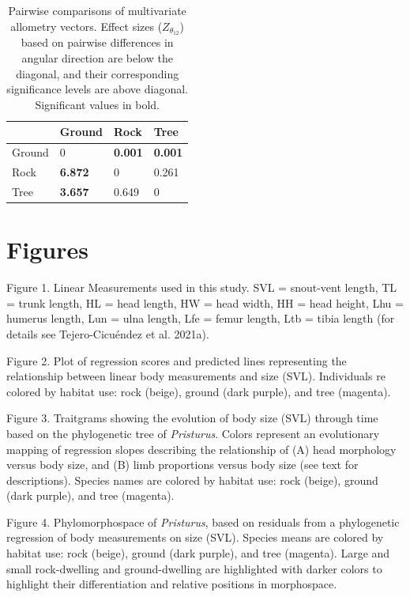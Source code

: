 \documentclass[
]{article}
\begin{document}
\begin{table}[H]

\caption{\label{tab:unnamed-chunk-2}Pairwise comparisons of multivariate allometry vectors. Effect sizes ($Z_{\theta_{12}}$) based on pairwise differences in angular direction are below the diagonal, and their corresponding significance levels are above diagonal. Significant values in bold.}
\centering
\begin{tabular}[t]{llll}
\toprule
  & Ground & Rock & Tree\\
\midrule
Ground & 0 & \textbf{0.001} & \textbf{0.001}\\
Rock & \textbf{6.872} & 0 & 0.261\\
Tree & \textbf{3.657} & 0.649 & 0\\
\bottomrule
\end{tabular}
\end{table}

\newpage

\hypertarget{figures}{%
\section{Figures}\label{figures}}

Figure 1. Linear Measurements used in this study. SVL = snout-vent
length, TL = trunk length, HL = head length, HW = head width, HH = head
height, Lhu = humerus length, Lun = ulna length, Lfe = femur length, Ltb
= tibia length (for details see Tejero-Cicuéndez et al. 2021a).
\hfill\break

Figure 2. Plot of regression scores and predicted lines representing the
relationship between linear body measurements and size (SVL).
Individuals re colored by habitat use: rock (beige), ground (dark
purple), and tree (magenta). \hfill\break

Figure 3. Traitgrams showing the evolution of body size (SVL) through
time based on the phylogenetic tree of \emph{Pristurus}. Colors
represent an evolutionary mapping of regression slopes describing the
relationship of (A) head morphology versus body size, and (B) limb
proportions versus body size (see text for descriptions). Species names
are colored by habitat use: rock (beige), ground (dark purple), and tree
(magenta). \hfill\break

Figure 4. Phylomorphospace of \emph{Pristurus}, based on residuals from
a phylogenetic regression of body measurements on size (SVL). Species
means are colored by habitat use: rock (beige), ground (dark purple),
and tree (magenta). Large and small rock-dwelling and ground-dwelling
are highlighted with darker colors to highlight their differentiation
and relative positions in morphospace.
\end{document}
